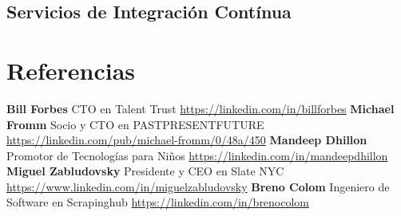 \documentclass[11pt,a4paper,english]{moderncv}
\begin{document}
\subsection{}

\subsection{Servicios de Integración Contínua}

\clearpage

\section{Referencias}
\cvlistitem
{
    \textbf{Bill Forbes}
    \newline{}
    CTO en Talent Trust
    \newline{}
    \url{https://linkedin.com/in/billforbes}
}
\cvlistitem
{
    \textbf{Michael Fromm}
    \newline{}
    Socio y CTO en PASTPRESENTFUTURE
    \newline{}
    \url{https://linkedin.com/pub/michael-fromm/0/48a/450}
}
\cvlistitem
{
    \textbf{Mandeep Dhillon}
    \newline{}
    Promotor de Tecnologías para Niños
    \newline{}
    \url{https://linkedin.com/in/mandeepdhillon}
}
\cvlistitem
{
    \textbf{Miguel Zabludovsky}
    \newline{}
    Presidente y CEO en Slate NYC
    \newline{}
    \url{https://www.linkedin.com/in/miguelzabludovsky}
}
\cvlistitem
{
    \textbf{Breno Colom}
    \newline{}
    Ingeniero de Software en Scrapinghub
    \newline{}
    \url{https://linkedin.com/in/brenocolom}
}
\end{document}
